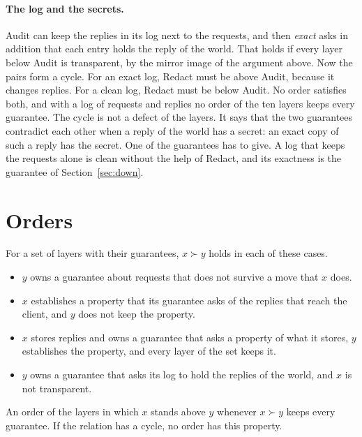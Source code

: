 \documentclass[acmsmall,nonacm,screen]{acmart}
\newcommand{\ly}[1]{\textsf{#1}}
\newcommand{\mustabove}{\succ}
\newcommand{\claim}[2]{#2}
\begin{document}
\paragraph{The log and the secrets.} \ly{Audit} can keep the replies in its log next to the
requests, and then \emph{exact} asks in addition that each entry holds the reply of the
world. That holds if every layer below \ly{Audit} is transparent, by the mirror image of the
argument above. Now the pairs form a cycle. For an exact log, \ly{Redact} must be above
\ly{Audit}, because it changes replies. For a clean log, \ly{Redact} must be below
\ly{Audit}. \claim{conflict}{No order satisfies both, and with a log of requests and replies
no order of the ten layers keeps every guarantee.} The cycle is not a defect of the layers.
It says that the two guarantees contradict each other when a reply of the world has a
secret: an exact copy of such a reply has the secret. One of the guarantees has to give. A
log that keeps the requests alone is clean without the help of \ly{Redact}, and its
exactness is the guarantee of Section~\ref{sec:down}.

\section{Orders}
\label{sec:orders}

\begin{definition}
\label{def:above}
For a set of layers with their guarantees, $x \mustabove y$ holds in each of these cases.
\begin{itemize}
\item $y$ owns a guarantee about requests that does not survive a move that $x$ does.
\item $x$ establishes a property that its guarantee asks of the replies that reach the
  client, and $y$ does not keep the property.
\item $x$ stores replies and owns a guarantee that asks a property of what it stores, $y$
  establishes the property, and every layer of the set keeps it.
\item $y$ owns a guarantee that asks its log to hold the replies of the world, and $x$ is
  not transparent.
\end{itemize}
\end{definition}

\begin{theorem}[Orders]
\label{thm:orders}
An order of the layers in which $x$ stands above $y$ whenever $x \mustabove y$ keeps every
guarantee. If the relation has a cycle, no order has this property.
\end{theorem}
\end{document}
